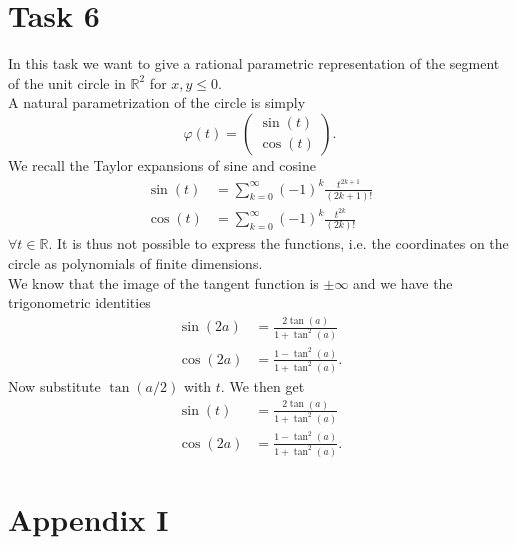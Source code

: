 \documentclass[]{article}
\begin{document}
\section*{Task 6}
In this task we want to give a rational parametric representation of the segment of the unit circle in $\mathbb{R}^2$ for $x, y \leq 0$.\\
A natural parametrization of the circle is simply\begin{equation*}
\varphi(t) = \left(\begin{array}{c}
\sin(t)\\
\cos(t)
\end{array}\right).
\end{equation*}
We recall the Taylor expansions of sine and cosine\begin{equation}
\begin{aligned}
\sin(t) &= \sum_{k=0}^{\infty}(-1)^k\frac{t^{2k+1}}{(2k+1)!}\\
\cos(t) &= \sum_{k=0}^{\infty}(-1)^k\frac{t^{2k}}{(2k)!}
\end{aligned}
\end{equation}
$\forall t\in\mathbb{R}$. It is thus not possible to express the functions, i.e. the coordinates on the circle as polynomials of finite dimensions.\\
We know that the image of the tangent function is $\pm\infty$ and we have the trigonometric identities \begin{equation*}
\begin{aligned}
\sin(2a) & = \frac{2\tan(a)}{1 + \tan^2(a)}\\
\cos(2a) &= \frac{1 - \tan^2(a)}{1 + \tan^2(a)}.
\end{aligned}
\end{equation*}
Now substitute $\tan(a/2)$ with $t$. We then get \begin{equation*}
\begin{aligned}
\sin(t) & = \frac{2\tan(a)}{1 + \tan^2(a)}\\
\cos(2a) &= \frac{1 - \tan^2(a)}{1 + \tan^2(a)}.
\end{aligned}
\end{equation*} 
\section*{Appendix I}
%
\end{document}
